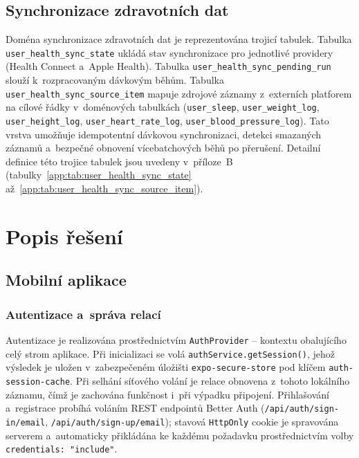 \subsection{Synchronizace zdravotních dat}

Doména synchronizace zdravotních dat je reprezentována trojicí tabulek.
Tabulka \texttt{user\_}\allowbreak\texttt{health\_}\allowbreak\texttt{sync\_}\allowbreak\texttt{state}
ukládá stav synchronizace pro jednotlivé providery (Health Connect
a~Apple Health). Tabulka
\texttt{user\_}\allowbreak\texttt{health\_}\allowbreak\texttt{sync\_}\allowbreak\texttt{pending\_}\allowbreak\texttt{run}
slouží k~rozpracovaným dávkovým běhům. Tabulka
\texttt{user\_}\allowbreak\texttt{health\_}\allowbreak\texttt{sync\_}\allowbreak\texttt{source\_}\allowbreak\texttt{item}
mapuje zdrojové záznamy z~externích platforem na cílové řádky v~doménových
tabulkách (\texttt{user\_}\allowbreak\texttt{sleep},
\texttt{user\_}\allowbreak\texttt{weight\_}\allowbreak\texttt{log},
\texttt{user\_}\allowbreak\texttt{height\_}\allowbreak\texttt{log},
\texttt{user\_}\allowbreak\texttt{heart\_}\allowbreak\texttt{rate\_}\allowbreak\texttt{log},
\texttt{user\_}\allowbreak\texttt{blood\_}\allowbreak\texttt{pressure\_}\allowbreak\texttt{log}).
Tato vrstva umožňuje idempotentní
dávkovou synchronizaci, detekci smazaných záznamů a~bezpečné obnovení
vícebatchových běhů po přerušení. Detailní definice této trojice tabulek
jsou uvedeny v~příloze~B (tabulky~\ref{app:tab:user_health_sync_state}
až~\ref{app:tab:user_health_sync_source_item}).

\section{Popis řešení}

\subsection{Mobilní aplikace}

\subsubsection{Autentizace a~správa relací}

{\sloppy
Autentizace je realizována prostřednictvím \texttt{AuthProvider} --
kontextu obalujícího celý strom aplikace. Při inicializaci se volá
\texttt{authService.\allowbreak getSession()}, jehož výsledek je uložen v~zabezpečeném
úložišti \texttt{expo-secure-}\allowbreak\texttt{store} pod klíčem \texttt{auth-session-}\allowbreak\texttt{cache}.
Při selhání síťového volání je relace obnovena z~tohoto lokálního záznamu,
čímž je zachována funkčnost i~při výpadku připojení. Přihlašování
a~registrace probíhá voláním REST endpointů Better Auth
(\texttt{/api/}\allowbreak\texttt{auth/}\allowbreak\texttt{sign-in/}\allowbreak\texttt{email}, \texttt{/api/}\allowbreak\texttt{auth/}\allowbreak\texttt{sign-up/}\allowbreak\texttt{email});
stavová \texttt{HttpOnly} cookie je spravována serverem a~automaticky
přikládána ke každému požadavku prostřednictvím volby \texttt{credentials:~"include"}.
}

